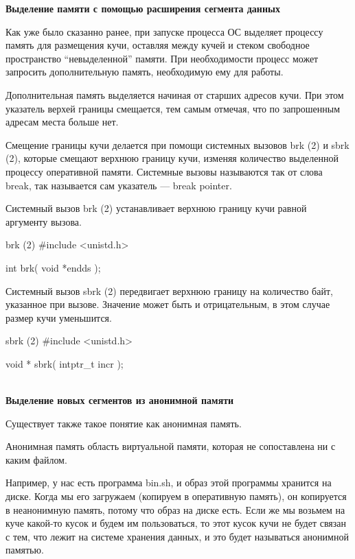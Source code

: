 \textbf{Выделение памяти с помощью расширения сегмента данных}

Как уже было сказанно ранее, при запуске процесса ОС выделяет процессу память для размещения кучи, оставляя между кучей и стеком свободное пространство “невыделенной” памяти. При необходимости процесс может запросить дополнительную память, необходимую ему для работы.

Дополнительная память выделяется начиная от старших адресов кучи. При этом указатель верхей границы смещается, тем самым отмечая, что по запрошенным адресам места больше нет.

Смещение границы кучи делается при помощи системных вызовов brk (2) и sbrk (2), которые смещают верхнюю границу кучи, изменяя количество выделенной процессу оперативной памяти. Системные вызовы называются так от слова break, так называется сам указатель --- break pointer.

Системный вызов brk (2) устанавливает верхнюю границу кучи равной аргументу вызова.

\begin{CCode}{brk (2)}
	#include <unistd.h>

	int brk(
		void *endds
	); \end{CCode}

Системный вызов sbrk (2) передвигает верхнюю границу на количество байт, указанное при вызове. Значение может быть и отрицательным, в этом случае размер кучи уменьшится.

\begin{CCode}{sbrk (2)}
	#include <unistd.h>

	void * sbrk(
		intptr_t incr
	); \end{CCode} 

\\[1cm]
\textbf{Выделение новых сегментов из анонимной памяти}

Существует также такое понятие как анонимная память. 

\begin{defi}{Анонимная память}
	область виртуальной памяти, которая не сопоставлена ни с каким файлом.
\end{defi}

Например, у нас есть программа bin.sh, и образ этой программы хранится на диске. Когда мы его загружаем (копируем в оперативную память), он копируется в неанонимную память, потому что образ на диске есть. Если же мы возьмем на куче какой-то кусок и будем им пользоваться, то этот кусок кучи не будет связан с тем, что лежит на системе хранения данных, и это будет называться анонимной памятью. 

